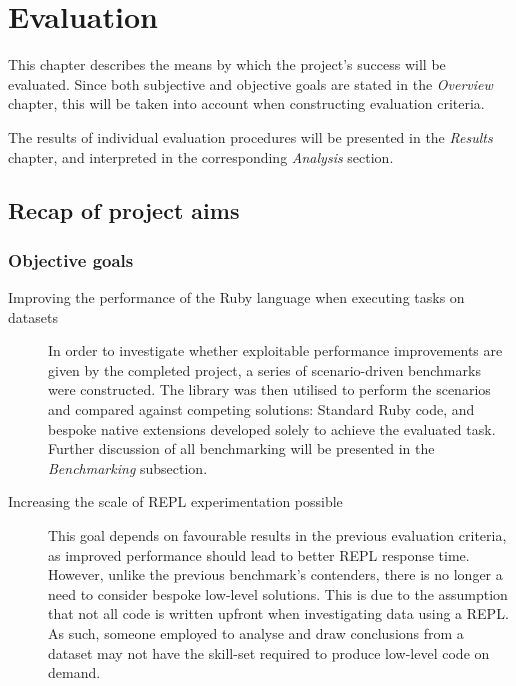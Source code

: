 \chapter{Evaluation}
This chapter describes the means by which the project's success will be evaluated.
Since both subjective and objective goals are stated in the \emph{Overview} chapter, this will be taken into account when constructing evaluation criteria.

The results of individual evaluation procedures will be presented in the \emph{Results} chapter, and interpreted in the corresponding \emph{Analysis} section.

\section{Recap of project aims}
\subsection{Objective goals}
\begin{description}
\item[Improving the performance of the Ruby language when executing tasks on datasets]
In order to investigate whether exploitable performance improvements are given by the completed project, a series of scenario-driven benchmarks were constructed.
The library was then utilised to perform the scenarios and compared against competing solutions: Standard Ruby code, and bespoke native extensions developed solely to achieve the evaluated task.
Further discussion of all benchmarking will be presented in the \emph{Benchmarking} subsection.
\item[Increasing the scale of \ac{REPL} experimentation possible]
This goal depends on favourable results in the previous evaluation criteria, as improved performance should lead to better \ac{REPL} response time. However, unlike the previous benchmark's contenders, there is no longer a need to consider bespoke low-level solutions. This is due to the assumption that not all code is written upfront when investigating data using a \ac{REPL}. As such, someone employed to analyse and draw conclusions from a dataset may not have the skill-set required to produce low-level code on demand.
\end{description}

